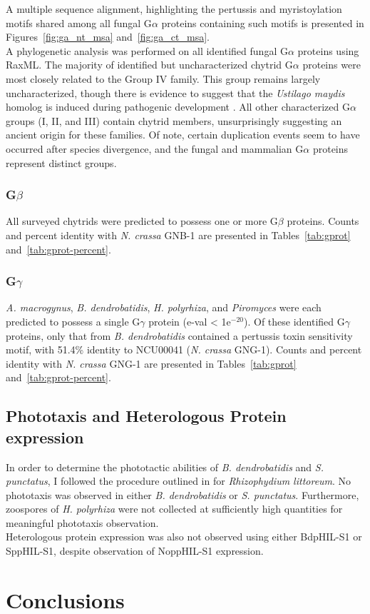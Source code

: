 \indent A multiple sequence alignment, highlighting the pertussis and myristoylation motifs shared among all fungal G$\alpha$ proteins containing such motifs is presented in Figures~\ref{fig:ga_nt_msa} and~\ref{fig:ga_ct_msa}.\\
\indent A phylogenetic analysis was performed on all identified fungal G$\alpha$ proteins using RaxML. The majority of identified but uncharacterized chytrid G$\alpha$ proteins were most closely related to the Group IV family. This group remains largely uncharacterized, though there is evidence to suggest that the \textit{Ustilago maydis} homolog is induced during pathogenic development \cite{Bolker1998}. All other characterized G$\alpha$ groups (I, II, and III) contain chytrid members, unsurprisingly suggesting an ancient origin for these families. Of note, certain duplication events seem to have occurred after species divergence, and the fungal and mammalian G$\alpha$ proteins represent distinct groups.\\
\subsubsection{G$\beta$}
All surveyed chytrids were predicted to possess one or more G$\beta$ proteins. Counts and percent identity with \textit{N. crassa} GNB-1 are presented in Tables~\ref{tab:gprot} and~\ref{tab:gprot-percent}.
\subsubsection{G$\gamma$}
\textit{A. macrogynus}, \textit{B. dendrobatidis}, \textit{H. polyrhiza}, and \textit{Piromyces} were each predicted to possess a single G$\gamma$ protein (e-val < 1e$^{-20}$). Of these identified G$\gamma$ proteins, only that from \textit{B. dendrobatidis} contained a pertussis toxin sensitivity motif, with 51.4\% identity to NCU00041 (\textit{N. crassa} GNG-1). Counts and percent identity with \textit{N. crassa} GNG-1 are presented in Tables~\ref{tab:gprot} and~\ref{tab:gprot-percent}.
\subsection{Phototaxis and Heterologous Protein expression}
In order to determine the phototactic abilities of \textit{B. dendrobatidis} and \textit{S. punctatus}, I followed the procedure outlined in \cite{Muehlstein1987} for \textit{Rhizophydium littoreum}. No phototaxis was observed in either \textit{B. dendrobatidis} or \textit{S. punctatus}. Furthermore, zoospores of \textit{H. polyrhiza} were not collected at sufficiently high quantities for meaningful phototaxis observation.\\
\indent Heterologous protein expression was also not observed using either BdpHIL-S1 or SppHIL-S1, despite observation of NoppHIL-S1 expression.\\ 
\section{Conclusions}
